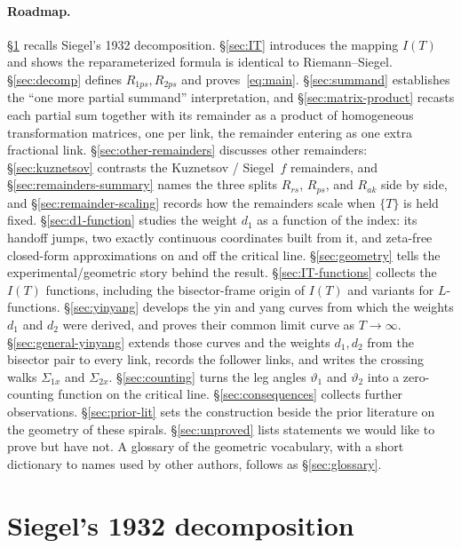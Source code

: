 \documentclass[11pt]{article}
\theoremstyle{definition}
\begin{document}
\paragraph{Roadmap.} \S\ref{sec:siegel} recalls Siegel's 1932 decomposition.
\S\ref{sec:IT} introduces the mapping $I(T)$ and shows the reparameterized
formula is identical to Riemann--Siegel. \S\ref{sec:decomp} defines
$R_{1ps},R_{2ps}$ and proves~\eqref{eq:main}. \S\ref{sec:summand} establishes the
``one more partial summand'' interpretation, and \S\ref{sec:matrix-product}
recasts each partial sum together with its remainder as a product of
homogeneous transformation matrices, one per link, the remainder entering as
one extra fractional link.
\S\ref{sec:other-remainders} discusses other remainders: \S\ref{sec:kuznetsov}
contrasts the Kuznetsov / Siegel~$f$ remainders, and
\S\ref{sec:remainders-summary} names the three splits $R_{rs}$, $R_{ps}$, and
$R_{ak}$ side by side, and \S\ref{sec:remainder-scaling} records how the
remainders scale when $\{T\}$ is held fixed.
\S\ref{sec:d1-function} studies the weight $d_1$ as a function of the index:
its handoff jumps, two exactly continuous coordinates built from it, and
zeta-free closed-form approximations on and off the critical line.
\S\ref{sec:geometry} tells the experimental/geometric story
behind the result. \S\ref{sec:IT-functions} collects the $I(T)$ functions,
including the bisector-frame origin of $I(T)$ and variants for
$L$-functions. \S\ref{sec:yinyang} develops the yin and yang
curves from which the weights $d_1$ and $d_2$ were derived, and proves
their common limit curve as $T\to\infty$.
\S\ref{sec:general-yinyang} extends those curves and the weights $d_1,d_2$
from the bisector pair to every link, records the follower links, and writes
the crossing walks
$\Sigma_{1x}$ and $\Sigma_{2x}$.
\S\ref{sec:counting} turns the leg angles $\vartheta_1$ and $\vartheta_2$
into a zero-counting function on the critical line.
\S\ref{sec:consequences} collects further observations.
\S\ref{sec:prior-lit} sets the construction beside the prior literature on the
geometry of these spirals.
\S\ref{sec:unproved} lists statements we would like to prove but have not.
A glossary of the geometric vocabulary, with a short dictionary to names
used by other authors, follows as \S\ref{sec:glossary}.

\section{Siegel's 1932 decomposition}\label{sec:siegel}
\end{document}
